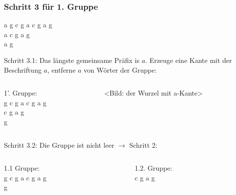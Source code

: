 \documentclass{beamer}
\begin{document}

\begin{frame}[t]
\frametitle{Schritt 3 für 1. Gruppe}
    a g c g a c g a g   \\
    a c g a g           \\
    a g                 \\

    \medskip

    Schritt 3.1: Das längste gemeinsame Präfix is $a$. Erzeuge eine Kante mit der Beschriftung $a$, entferne $a$ von Wörter der Gruppe:

    \medskip

    \begin{columns}

    \begin{column}[t]{0.3\textwidth}
        1'. Gruppe:     \\
        g c g a c g a g \\
        c g a g         \\
        g               \\
    \end{column}

    \begin{column}[t]{0.3\textwidth}
        <Bild: der Wurzel mit a-Kante>
    \end{column}

\end{columns}

    \medskip

    Schritt 3.2: Die Gruppe ist nicht leer $\rightarrow$ Schritt 2:

    \begin{columns}

    \begin{column}[t]{0.3\textwidth}
        1.1 Gruppe:     \\
        g c g a c g a g \\
        g               \\
    \end{column}

    \begin{column}[t]{0.3\textwidth}
        1.2. Gruppe:    \\
        c g a g         \\
    \end{column}

\end{columns}

\end{frame}
\end{document}
